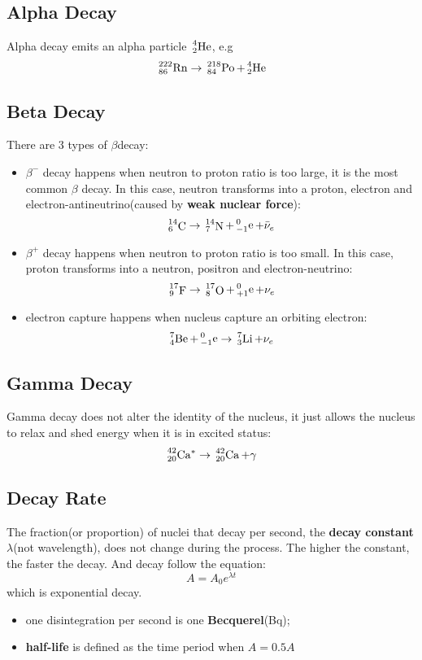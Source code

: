 \documentclass[10pt,a4paper,oneside]{article}
\begin{document}
\subsection{Alpha Decay}
Alpha decay emits an alpha particle $\sideset{^4_2}{}{\mathop{\mathrm{He}}}$, e.g
\[
\sideset{^{222}_{86}}{}{\mathop{\mathrm{Rn}}} \rightarrow \sideset{^{218}_{84}}{}{\mathop{\mathrm{Po}}}+
\sideset{^4_2}{}{\mathop{\mathrm{He}}}
\]

\subsection{Beta Decay}
There are $3$ types of $\beta$decay:
\begin{itemize}
	\item $\beta^-$ decay happens when neutron to proton ratio is too large, it is the most common $\beta$ decay. In this case, neutron transforms into a proton, electron and electron-antineutrino(caused by \textbf{weak nuclear force}):
	\[
	\sideset{^{14}_{6}}{}{\mathop{\mathrm{C}}} \rightarrow \sideset{^{14}_{7}}{}{\mathop{\mathrm{N}}}+
	\sideset{^0_{-1}}{}{\mathop{\mathrm{e}}}+\bar{\nu}_e
	\]
	\item $\beta^+$ decay happens when neutron to proton ratio is too small. In this case, proton transforms into a neutron, positron and electron-neutrino:
	\[
	\sideset{^{17}_{9}}{}{\mathop{\mathrm{F}}} \rightarrow \sideset{^{17}_{8}}{}{\mathop{\mathrm{O}}}+
	\sideset{^0_{+1}}{}{\mathop{\mathrm{e}}}+\nu_e
	\]
	\item electron capture happens when nucleus capture an orbiting electron:
	\[
	\sideset{^{7}_{4}}{}{\mathop{\mathrm{Be}}}+ \sideset{^0_{-1}}{}{\mathop{\mathrm{e}}} \rightarrow \sideset{^{7}_{3}}{}{\mathop{\mathrm{Li}}}+\nu_e
	\]
\end{itemize}

\subsection{Gamma Decay}
Gamma decay does not alter the identity of the nucleus, it just allows the nucleus to relax and shed energy when it is in excited status:
\[
\sideset{^{42}_{20}}{}{\mathop{\mathrm{Ca^*}}} \rightarrow \sideset{^{42}_{20}}{}{\mathop{\mathrm{Ca}}} + \gamma
\]

\subsection{Decay Rate}
The fraction(or proportion) of nuclei that decay per second, the \textbf{decay constant} $\lambda$(not wavelength), does not change during the process. The higher the constant, the faster the decay. And decay follow the equation:
\[
A = A_0 e^{\lambda t}
\]
which is exponential decay.
\begin{itemize}
	\item one disintegration per second is one \textbf{Becquerel}(Bq);
	\item  \textbf{half-life} is defined as the time period when $A = 0.5A$
\end{itemize}
\end{document}
